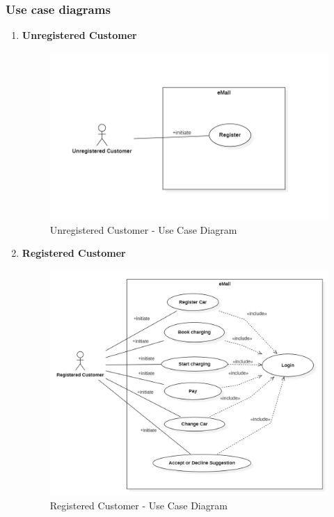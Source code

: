\subsubsection{Use case diagrams}
\begin{enumerate}
    \item \textbf{Unregistered Customer}
    \begin{figure}[H]
        \begin{center}
            \includegraphics[width=\textwidth]{img/Unregistered_customer.PNG}
            \caption{Unregistered Customer - Use Case Diagram}
        \end{center}
    \end{figure}

    \item \textbf{Registered Customer}
    \begin{figure}[H]
        \begin{center}
            \includegraphics[width=\textwidth]{img/Registered_customer.PNG}
            \caption{Registered Customer - Use Case Diagram}
        \end{center}
    \end{figure}


\end{enumerate}
